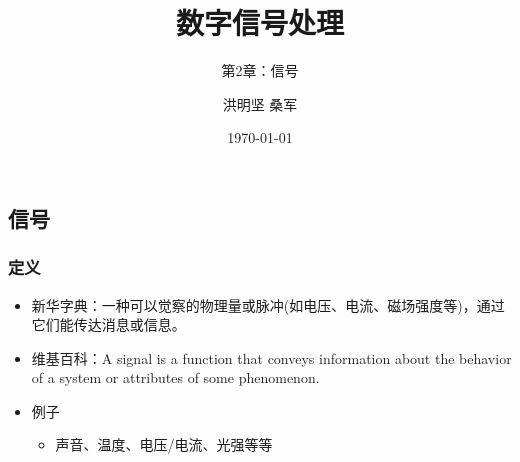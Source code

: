 \documentclass[CJKutf8,xcolor=pdftex,dvipsnames,table]{beamer}
\begin{document}
\begin{CJK*}{UTF8}{song}

  \title{ 数字信号处理}
  \subtitle{ 第2章：信号}
  \author{ 洪明坚 \hspace{1mm} 桑军}
  \date{\today}


  \frame{\titlepage}
  
  \section{信号}
  
  \begin{frame}
    \frametitle{定义}
    \begin{itemize}
    \item 新华字典：一种可以觉察的物理量或脉冲(如电压、电流、磁场强度等)，通过它们能传达消息或信息。
    \item 维基百科：A signal is a function that conveys information about the behavior of a system or attributes of some phenomenon.
    \item 例子
        \begin{itemize}
        \item 声音、温度、电压/电流、光强等等
        \end{itemize}    
    \end{itemize}
  \end{frame}
  

\end{CJK*}
\end{document}
